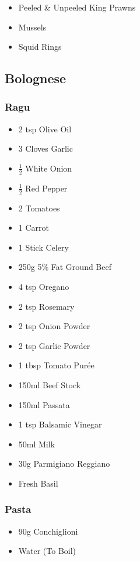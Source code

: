 \documentclass[11pt, english]{article}
\begin{document}
	\begin{itemize}
        \setlength\itemsep{0cm}
		\item Peeled \& Unpeeled King Prawns
		\item Mussels
		\item Squid Rings
        \end{itemize}

\newpage

	\subsection{Bolognese}

		\subsubsection*{Ragu}

	\begin{itemize}
        \setlength\itemsep{0cm}
		\item 2 tsp Olive Oil
		\item 3 Cloves Garlic
		\item $\frac{1}{2}$ White Onion
		\item $\frac{1}{2}$ Red Pepper
		\item 2 Tomatoes
		\item 1 Carrot
		\item 1 Stick Celery
		\item 250g 5\% Fat Ground Beef
		\item 4 tsp Oregano
		\item 2 tsp Rosemary
		\item 2 tsp Onion Powder
		\item 2 tsp Garlic Powder
		\item 1 tbsp Tomato Pur\'{e}e
		\item 150ml Beef Stock
		\item 150ml Passata
		\item 1 tsp Balsamic Vinegar
		\item 50ml Milk
		\item 30g Parmigiano Reggiano
		\item Fresh Basil
        \end{itemize}

		\subsubsection*{Pasta}

	\begin{itemize}
        \setlength\itemsep{0cm}
                \item 90g Conchiglioni
		\item Water (To Boil)
        \end{itemize}
\end{document}
